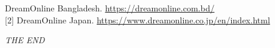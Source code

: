 \begin{flushleft}
[1] DreamOnline Bangladesh. \url{https://dreamonline.com.bd/}\\
\vspace{9pt}
[2] DreamOnline Japan. \url{https://www.dreamonline.co.jp/en/index.html}
\end{flushleft}

\vfill

\begin{center}
\textit{THE END}
\end{center}
